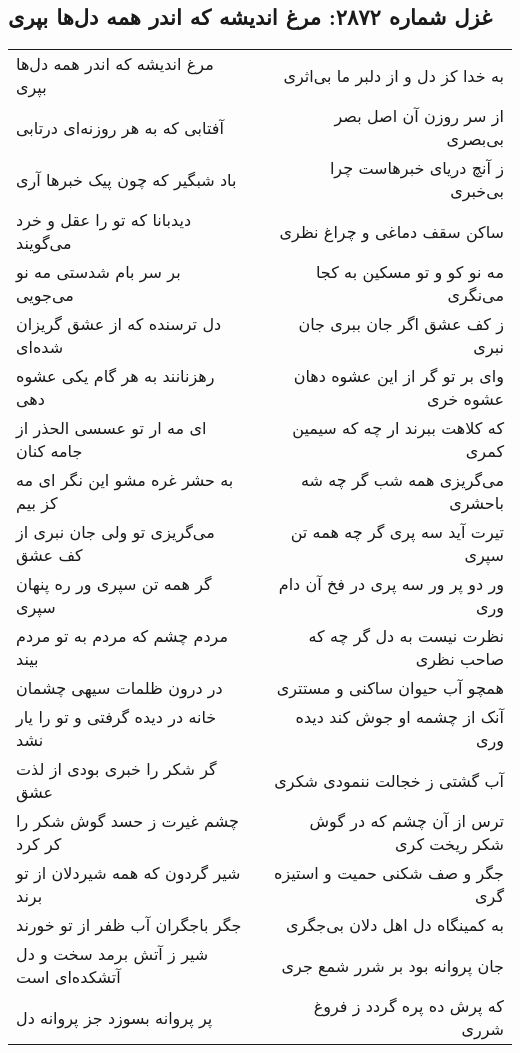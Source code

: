 \begin{center}
\section*{غزل شماره ۲۸۷۲: مرغ اندیشه که اندر همه دل‌ها بپری}
\label{sec:2872}
\begin{longtable}{l p{0.5cm} r}
مرغ اندیشه که اندر همه دل‌ها بپری
&&
به خدا کز دل و از دلبر ما بی‌اثری
\\
آفتابی که به هر روزنه‌ای درتابی
&&
از سر روزن آن اصل بصر بی‌بصری
\\
باد شبگیر که چون پیک خبرها آری
&&
ز آنچ دریای خبرهاست چرا بی‌خبری
\\
دیدبانا که تو را عقل و خرد می‌گویند
&&
ساکن سقف دماغی و چراغ نظری
\\
بر سر بام شدستی مه نو می‌جویی
&&
مه نو کو و تو مسکین به کجا می‌نگری
\\
دل ترسنده که از عشق گریزان شده‌ای
&&
ز کف عشق اگر جان ببری جان نبری
\\
رهزنانند به هر گام یکی عشوه دهی
&&
وای بر تو گر از این عشوه دهان عشوه خری
\\
ای مه ار تو عسسی الحذر از جامه کنان
&&
که کلاهت ببرند ار چه که سیمین کمری
\\
به حشر غره مشو این نگر ای مه کز بیم
&&
می‌گریزی همه شب گر چه شه باحشری
\\
می‌گریزی تو ولی جان نبری از کف عشق
&&
تیرت آید سه پری گر چه همه تن سپری
\\
گر همه تن سپری ور ره پنهان سپری
&&
ور دو پر ور سه پری در فخ آن دام وری
\\
مردم چشم که مردم به تو مردم بیند
&&
نظرت نیست به دل گر چه که صاحب نظری
\\
در درون ظلمات سیهی چشمان
&&
همچو آب حیوان ساکنی و مستتری
\\
خانه در دیده گرفتی و تو را یار نشد
&&
آنک از چشمه او جوش کند دیده وری
\\
گر شکر را خبری بودی از لذت عشق
&&
آب گشتی ز خجالت ننمودی شکری
\\
چشم غیرت ز حسد گوش شکر را کر کرد
&&
ترس از آن چشم که در گوش شکر ریخت کری
\\
شیر گردون که همه شیردلان از تو برند
&&
جگر و صف شکنی حمیت و استیزه گری
\\
جگر باجگران آب ظفر از تو خورند
&&
به کمینگاه دل اهل دلان بی‌جگری
\\
شیر ز آتش برمد سخت و دل آتشکده‌ای است
&&
جان پروانه بود بر شرر شمع جری
\\
پر پروانه بسوزد جز پروانه دل
&&
که پرش ده پره گردد ز فروغ شرری

\end{longtable}
\end{center}
